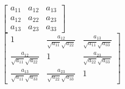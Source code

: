 \documentclass[12pt]{article}
\begin{document}
$\left[
\begin{matrix}
a_{11} & a_{12} & a_{13}\\
a_{12} & a_{22} & a_{23}\\
a_{13} & a_{23} & a_{33}
\end{matrix}
\right]$\\[1cm]

$\displaystyle \left[
\begin{matrix}
1 & \frac{a_{12}}{\sqrt{a_{11}} \sqrt{a_{22}}} & \frac{a_{13}}{\sqrt{a_{11}} \sqrt{a_{33}}}\\
\frac{a_{12}}{\sqrt{a_{11}} \sqrt{a_{22}}} & 1 & \frac{a_{23}}{\sqrt{a_{22}} \sqrt{a_{33}}}\\
\frac{a_{13}}{\sqrt{a_{11}} \sqrt{a_{33}}} & \frac{a_{23}}{\sqrt{a_{22}} \sqrt{a_{33}}} & 1
\end{matrix}
\right]$
\end{document}
